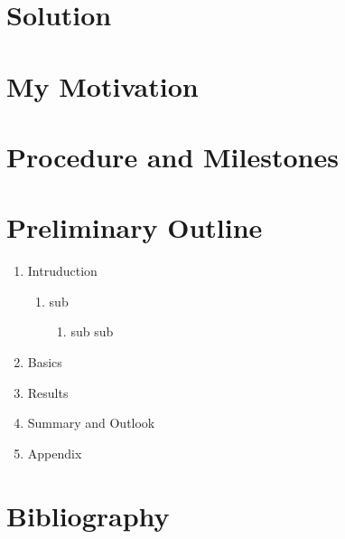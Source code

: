 \documentclass[letterpaper,oneside,11pt]{article}
\begin{document}
\section{Solution}


\section{My Motivation}


\section{Procedure and Milestones}


\section{Preliminary Outline}

\begin{enumerate}
\item Intruduction
	\begin{enumerate}
	\item sub
		\begin{enumerate}
		\item sub sub
		\end{enumerate}
	\end{enumerate}

\item Basics
\item Results
\item Summary and Outlook
\item Appendix

\end{enumerate}

\section*{Bibliography}
\end{document}
